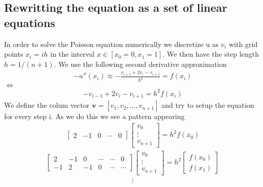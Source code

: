 \documentclass[american,a4paper,12pt]{article}
\renewcommand{\vec}[1]{\mathbf{#1}} %
\begin{document}
  \subsection{Rewritting the equation as a set of linear equations}
  In order to solve the Poisson equation numerically we discretize u as $v_i$ with grid points $x_i = ih$ in the interval $x \in [x_0 = 0,x_1 = 1]$. We then have the step length $h = 1/(n + 1)$. We use the following second derivative approximation
  \begin{align*}
    -u''(x_i) \approx -\frac{v_{i+1} + 2v_i - v_{i+1}}{h^2} =  f(x_i)
  \end{align*}
  $\Longleftrightarrow$
  \begin{align*}
    -v_{i-1} + 2v_i - v_{i+1} = h^2f(x_i)
  \end{align*}
  We define the colum vector $\vec{v} = [v_1, v_2, \hdots, v_{n+1}]$ and try to setup the equation for every step i. As we do this we see a pattern appearing
  \begin{align*}
        \begin{bmatrix}
          2 & -1 & 0 & \cdots & 0
        \end{bmatrix}
        \begin{bmatrix}
          v_0 \\
          \vdots \\
          v_{n+1}
        \end{bmatrix}
  = h^2f(x_0)
  \end{align*}
  \begin{align*}
        \begin{bmatrix}
          2 & -1 & 0 & \cdots & \cdots & 0 \\
          -1 & 2 & -1 & 0 & \cdots & \cdots
        \end{bmatrix}
        \begin{bmatrix}
          v_0 \\
          \vdots \\
          v_{n+1}
        \end{bmatrix}
  = h^2
        \begin{bmatrix}
          f(x_0) \\
          f(x_1)
        \end{bmatrix}
  \end{align*}
  \begin{align*}
    \vdots
  \end{align*}
\end{document}
